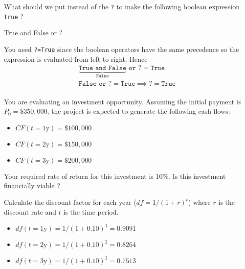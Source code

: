 \documentclass[12pt,a4paper]{exam}
\begin{document}
\begin{questions}

\question
What should we put instead of the \texttt{?} to make the following boolean expression \texttt{True} ?
\begin{ipython}
True and False or ?
\end{ipython}
\fillwithlines{1cm}
\begin{solution}
You need \texttt{?=True} since the boolean operators have the same precedence so the expression is evaluated from left to right.
Hence
\begin{equation*}
  \begin{gathered}
    \underbrace{\texttt{True and False}}_{\texttt{False}}\texttt{ or ?} = \texttt{True} \\
    \texttt{False or ?} = \texttt{True} \implies \texttt{?} = \texttt{True} \\
    \end{gathered}
\end{equation*}
\end{solution}

\question
You are evaluating an investment opportunity. Assuming the initial payment is $P_0 = \$350,000$, the project is expected to generate the following cash flows:
\begin{itemize}
\item $CF(t=\text{1y})=\$100,000$
\item $CF(t=\text{2y})=\$150,000$
\item $CF(t=\text{3y})=\$200,000$
\end{itemize}
Your required rate of return for this investment is 10\%. Is this investment financially viable ?
\fillwithlines{3cm}
\begin{solution}
Calculate the discount factor for each year ($df=1 / (1 + r)^t$) where $r$ is the discount rate and $t$ is the time period.
\begin{itemize}
\item $df(t=\text{1y})=1 / (1 + 0.10)^1 = 0.9091$
\item $df(t=\text{2y})=1 / (1 + 0.10)^2 = 0.8264$
\item $df(t=\text{3y})=1 / (1 + 0.10)^3 = 0.7513$
\end{itemize}


\end{solution}
\end{questions}
\end{document}
